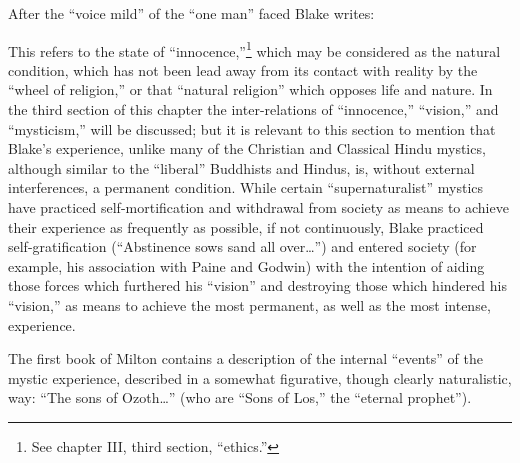 \label{self:11}


After the \enquote{voice mild} of the \enquote{one man} faced Blake writes:


This refers to the state of \enquote{innocence,}\footnote{See chapter III, third section, \enquote{ethics.}}
which may be considered as the natural condition, which has not been lead away from its contact
with reality by the \enquote{wheel of religion,} or that \enquote{natural religion} which
opposes life and nature. In the third section of this chapter the inter-relations
of \enquote{innocence,} \enquote{vision,} and \enquote{mysticism,} will be discussed; but it is relevant to
this section to mention that Blake's experience, unlike many of the Christian and Classical Hindu
mystics, although similar to the \enquote{liberal} Buddhists and Hindus, is, without external
interferences, a permanent condition. While certain \enquote{supernaturalist} mystics have practiced
self-mortification and withdrawal from society as means to achieve their experience as frequently
as possible, if not continuously, Blake practiced self-gratification (\enquote{Abstinence sows sand all over\dots})
and entered society (for example, his association with Paine and Godwin) with the intention
of aiding those forces which furthered his \enquote{vision} and destroying those which hindered his \enquote{vision,}
as means to achieve the most permanent, as well as the most intense, experience.

The first book of Milton contains a description of the internal \enquote{events} of the mystic experience,
described in a somewhat figurative, though clearly naturalistic, way: \enquote{The sons of Ozoth\dots} (who are \enquote{Sons of Los,}
the \enquote{eternal prophet}).

